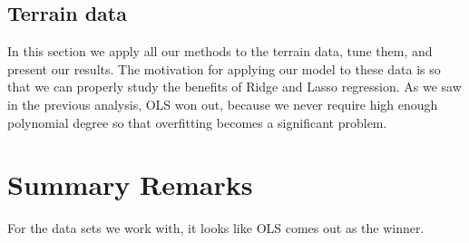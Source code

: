 \documentclass[a4paper, twocolumn]{article}
\begin{document}
\subsection{Terrain data}
In this section we apply all our methods to the terrain data, tune them, and present our results. The motivation for applying our model to these data is so that we can properly study the benefits of Ridge and Lasso regression. As we saw in the previous analysis, OLS won out, because we never require high enough polynomial degree so that overfitting becomes a significant problem.


\section{Summary Remarks}
For the data sets we work with, it looks like OLS comes out as the winner. 

\onecolumn{
\printbibliography
}
\end{document}
